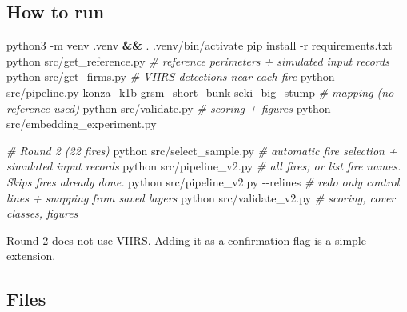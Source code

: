 \documentclass[
]{article}
\newenvironment{Shaded}{\begin{snugshade}}{\end{snugshade}}
\newcommand{\AttributeTok}[1]{\textcolor[rgb]{0.13,0.29,0.53}{#1}}
\newcommand{\BuiltInTok}[1]{#1}
\newcommand{\CommentTok}[1]{\textcolor[rgb]{0.56,0.35,0.01}{\textit{#1}}}
\newcommand{\ExtensionTok}[1]{#1}
\newcommand{\KeywordTok}[1]{\textcolor[rgb]{0.13,0.29,0.53}{\textbf{#1}}}
\newcommand{\NormalTok}[1]{#1}
\begin{document}
\subsection{How to run}\label{how-to-run}

\begin{Shaded}
\begin{Highlighting}[]
\ExtensionTok{python3} \AttributeTok{{-}m}\NormalTok{ venv .venv }\KeywordTok{\&\&} \BuiltInTok{.}\NormalTok{ .venv/bin/activate}
\ExtensionTok{pip}\NormalTok{ install }\AttributeTok{{-}r}\NormalTok{ requirements.txt}
\ExtensionTok{python}\NormalTok{ src/get\_reference.py      }\CommentTok{\# reference perimeters + simulated input records}
\ExtensionTok{python}\NormalTok{ src/get\_firms.py          }\CommentTok{\# VIIRS detections near each fire}
\ExtensionTok{python}\NormalTok{ src/pipeline.py konza\_k1b grsm\_short\_bunk seki\_big\_stump   }\CommentTok{\# mapping (no reference used)}
\ExtensionTok{python}\NormalTok{ src/validate.py           }\CommentTok{\# scoring + figures}
\ExtensionTok{python}\NormalTok{ src/embedding\_experiment.py}

\CommentTok{\# Round 2 (22 fires)}
\ExtensionTok{python}\NormalTok{ src/select\_sample.py      }\CommentTok{\# automatic fire selection + simulated input records}
\ExtensionTok{python}\NormalTok{ src/pipeline\_v2.py        }\CommentTok{\# all fires; or list fire names. Skips fires already done.}
\ExtensionTok{python}\NormalTok{ src/pipeline\_v2.py }\AttributeTok{{-}{-}relines}   \CommentTok{\# redo only control lines + snapping from saved layers}
\ExtensionTok{python}\NormalTok{ src/validate\_v2.py        }\CommentTok{\# scoring, cover classes, figures}
\end{Highlighting}
\end{Shaded}

Round 2 does not use VIIRS. Adding it as a confirmation flag is a simple
extension.

\subsection{Files}\label{files}
\end{document}
